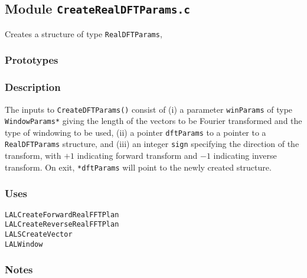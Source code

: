 \newpage
\subsection{Module \texttt{CreateRealDFTParams.c}}
\label{ss:CreateRealDFTParams.c}

Creates a structure of type \verb+RealDFTParams+,

\subsubsection*{Prototypes}
\vspace{0.1in}
%

\subsubsection*{Description}

The inputs to \verb+CreateDFTParams()+ consist of (i) a parameter
\verb+winParams+ of type \verb+WindowParams*+ giving the length of the vectors
to be Fourier  transformed and the type of windowing to be used, (ii) a
pointer \verb+dftParams+ to a pointer to a \verb+RealDFTParams+ structure, and
(iii) an integer \verb+sign+ specifying the direction of the transform, with
$+1$ indicating forward transform and $-1$ indicating inverse transform.  On
exit, \verb+*dftParams+ will point to the newly created structure.

\subsubsection*{Uses}
\begin{verbatim}
LALCreateForwardRealFFTPlan
LALCreateReverseRealFFTPlan
LALSCreateVector
LALWindow
\end{verbatim}

\subsubsection*{Notes}

